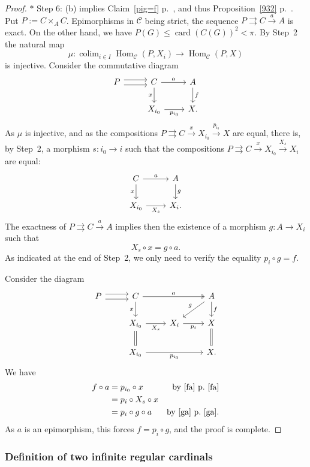 \documentclass[12pt]{article}%
\theoremstyle{remark}
\theoremstyle{definition}
\newcommand{\nn}{\noindent}
\newcommand{\C}{\mathcal C}
\newcommand{\parar}{\rightrightarrows}
\newcommand{\xr}{\xrightarrow}
\DeclareMathOperator*{\colim}{colim}%
\DeclareMathOperator{\card}{card}%
\DeclareMathOperator{\Hom}{Hom}%
\begin{document}
\begin{proof}
\nn$*$ Step 6: (b) implies Claim~\ref{pig=f} p.~\pageref{pig=f}, and thus Proposition~\ref{932} p.~\pageref{932}. Put $P:=C\times_AC$. Epimorphisms in $\C$ being strict, the sequence $P\parar C\xr aA$ is exact. On the other hand, we have $P(G)\le\card(C(G))^2<\pi$. By Step~2 the natural map 
$$
\mu:\colim_{i\in I}\Hom_\C(P,X_i)\to\Hom_\C(P,X)
$$ 
is injective. Consider the commutative diagram 
$$
\begin{tikzcd}
P\ar[yshift=0.7ex]{r}\ar[yshift=-0.7ex]{r}&C\ar{r}{a}\ar{d}[swap]{x}&A\ar{d}{f}\\ 
{}&X_{i_0}\ar{r}[swap]{p_{i_0}}&X.
\end{tikzcd}
$$ 
As $\mu$ is injective, and as the compositions $P\parar C\xr xX_{i_0}\xr{p_{i_0}}X$ are equal, there is, by Step~2, a morphism $s:i_0\to i$ such that the compositions $P\parar C\xr xX_{i_0}\xr{X_s} X_i$ are equal: 
$$
\begin{tikzcd}
C\ar{r}{a}\ar{d}[swap]{x}&A\ar{d}{g}\\ 
X_{i_0}\ar{r}[swap]{X_s}&X_i.
\end{tikzcd}
$$ 
The exactness of $P\parar C\xr aA$ implies then the existence of a morphism $g:A\to X_i$ such that 
%
\begin{equation}\label{ga}
X_s\circ x=g\circ a.
\end{equation}
%
As indicated at the end of Step~2, we only need to verify the equality $p_i\circ g=f$.

Consider the diagram 
$$
\begin{tikzcd}
P\ar[yshift=0.7ex]{r}\ar[yshift=-0.7ex]{r}&C\ar{d}[swap]{x}\ar[two heads]{rr}{a}&&A\ar{dl}[swap]{g}\ar{d}{f}\\ 
{}&X_{i_0}\ar{r}[swap]{X_s}\ar[equal]{d}&X_i\ar{r}[swap]{p_i}&X\ar[equal]{d}\\ 
{}&X_{i_0}\ar{rr}[swap]{p_{i_0}}&&X.
\end{tikzcd}
$$ 
We have 
%
\begin{align*}
f\circ a&=p_{i_0}\circ x&\text{by \eqref{fa} p.~\pageref{fa}}\\ 
&=p_i\circ X_s\circ x\\ 
&=p_i\circ g\circ a&\text{by \eqref{ga} p.~\pageref{ga}}.
\end{align*}
%
As $a$ is an epimorphism, this forces $f=p_i\circ g$, and the proof is complete.
\end{proof}


\subsubsection{Definition of two infinite regular cardinals}\label{tirg}
\end{document}
